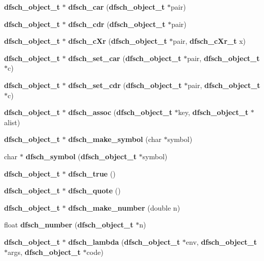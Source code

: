 \begin{CompactItemize}
\item 
{\bf dfsch\_\-object\_\-t} $\ast$ {\bf dfsch\_\-car} ({\bf dfsch\_\-object\_\-t} $\ast$pair)
\item 
{\bf dfsch\_\-object\_\-t} $\ast$ {\bf dfsch\_\-cdr} ({\bf dfsch\_\-object\_\-t} $\ast$pair)
\item 
{\bf dfsch\_\-object\_\-t} $\ast$ {\bf dfsch\_\-c\-Xr} ({\bf dfsch\_\-object\_\-t} $\ast$pair, {\bf dfsch\_\-c\-Xr\_\-t} x)
\item 
{\bf dfsch\_\-object\_\-t} $\ast$ {\bf dfsch\_\-set\_\-car} ({\bf dfsch\_\-object\_\-t} $\ast$pair, {\bf dfsch\_\-object\_\-t} $\ast$c)
\item 
{\bf dfsch\_\-object\_\-t} $\ast$ {\bf dfsch\_\-set\_\-cdr} ({\bf dfsch\_\-object\_\-t} $\ast$pair, {\bf dfsch\_\-object\_\-t} $\ast$c)
\item 
{\bf dfsch\_\-object\_\-t} $\ast$ {\bf dfsch\_\-assoc} ({\bf dfsch\_\-object\_\-t} $\ast$key, {\bf dfsch\_\-object\_\-t} $\ast$alist)
\item 
{\bf dfsch\_\-object\_\-t} $\ast$ {\bf dfsch\_\-make\_\-symbol} (char $\ast$symbol)
\item 
char $\ast$ {\bf dfsch\_\-symbol} ({\bf dfsch\_\-object\_\-t} $\ast$symbol)
\item 
{\bf dfsch\_\-object\_\-t} $\ast$ {\bf dfsch\_\-true} ()
\item 
{\bf dfsch\_\-object\_\-t} $\ast$ {\bf dfsch\_\-quote} ()
\item 
{\bf dfsch\_\-object\_\-t} $\ast$ {\bf dfsch\_\-make\_\-number} (double n)
\item 
float {\bf dfsch\_\-number} ({\bf dfsch\_\-object\_\-t} $\ast$n)
\item 
{\bf dfsch\_\-object\_\-t} $\ast$ {\bf dfsch\_\-lambda} ({\bf dfsch\_\-object\_\-t} $\ast$env, {\bf dfsch\_\-object\_\-t} $\ast$args, {\bf dfsch\_\-object\_\-t} $\ast$code)\label{dfsch_8h_a37}


\end{CompactItemize}
